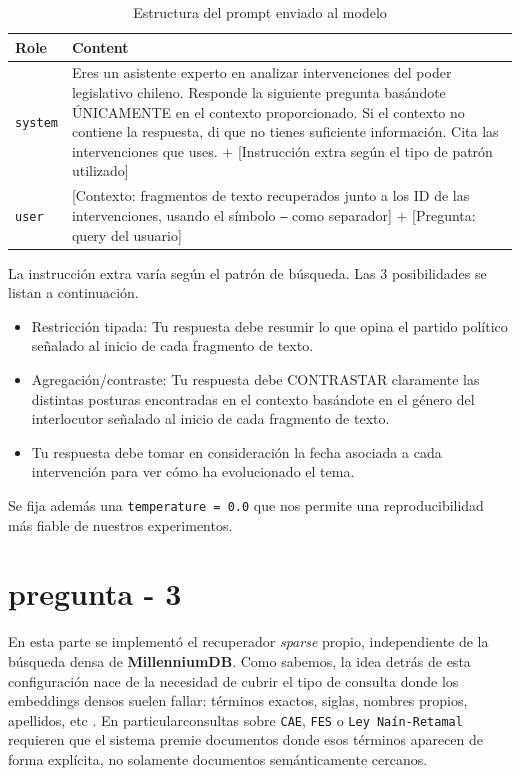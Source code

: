 \documentclass{article}
\begin{document}
\begin{table}[h]
\centering
\caption{Estructura del prompt enviado al modelo}
\label{tab:p2_prompts}
\begin{tabular}{@{}l p{10cm}@{}}
\toprule
\textbf{Role} & \textbf{Content} \\
\midrule
\texttt{system} & Eres un asistente experto en analizar intervenciones del poder legislativo chileno.
Responde la siguiente pregunta basándote ÚNICAMENTE en el contexto proporcionado.
Si el contexto no contiene la respuesta, di que no tienes suficiente información.
Cita las intervenciones que uses. $+$ [Instrucción extra según el tipo de patrón utilizado] \\
\texttt{user} & [Contexto: fragmentos de texto recuperados junto a los ID de las intervenciones, usando el símbolo \texttt{---} como separador] $+$ [Pregunta: query del usuario]\\
\bottomrule
\end{tabular}
\end{table}

La instrucción extra varía según el patrón de búsqueda. Las 3 posibilidades se listan a continuación.

\begin{itemize}
    \item Restricción tipada: Tu respuesta debe resumir lo que opina el partido político señalado al inicio de cada fragmento de texto.
    \item Agregación/contraste: Tu respuesta debe CONTRASTAR claramente las distintas posturas encontradas en el contexto basándote en el género del interlocutor señalado al inicio de cada fragmento de texto.
    \item Tu respuesta debe tomar en consideración la fecha asociada a cada intervención para ver cómo ha evolucionado el tema.
\end{itemize}

Se fija además una \texttt{temperature = 0.0} que nos permite una reproducibilidad más fiable de nuestros experimentos.

\newpage
\section*{pregunta - 3}

En esta parte se implementó el recuperador \textit{sparse} propio, independiente de la búsqueda densa de \textbf{MillenniumDB}. Como sabemos, la idea detrás de esta configuración nace de la necesidad de cubrir el tipo de consulta donde los embeddings densos suelen fallar: términos exactos, siglas, nombres propios, apellidos, etc .
En particularconsultas sobre \texttt{CAE}, \texttt{FES} o \texttt{Ley Naín-Retamal} requieren que el sistema premie documentos donde esos términos aparecen de forma explícita, no solamente documentos semánticamente cercanos.
\end{document}
